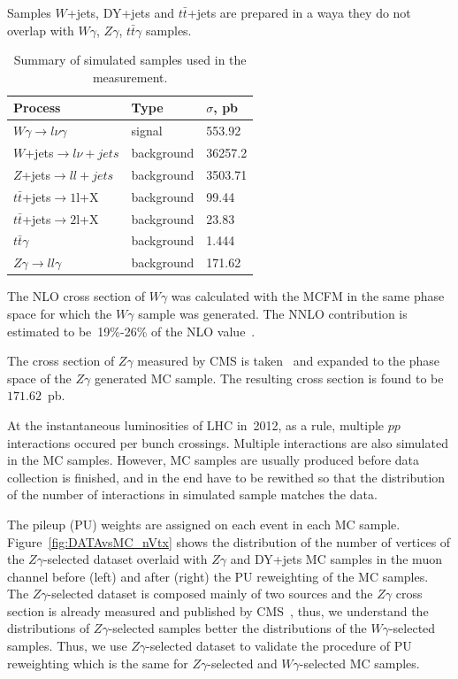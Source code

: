 Samples $W$+jets, DY+jets and $t\bar{t}$+jets are prepared in a waya they do not overlap with $W\gamma$, $Z\gamma$, $t\bar{t}\gamma$ samples.

\begin{table}[h]
  \small
  \begin{center}
    \caption{Summary of simulated samples used in the measurement.}
    \begin{tabular}{|l|l|l|}
      \hline
      Process                              & Type & $\sigma$, pb  \\ \hline
      $W\gamma \rightarrow l\nu\gamma$     & signal & 553.92   \\ \hline %
      $W$+jets$ \rightarrow l\nu + jets$   & background & 36257.2  \\ \hline %
      $Z$+jets$ \rightarrow ll + jets$     & background & 3503.71  \\ \hline
      $t\bar{t}$+jets$\rightarrow 1$l+X    & background & 99.44    \\ \hline %
      $t\bar{t}$+jets$\rightarrow 2$l+X    & background & 23.83    \\ \hline
      $t\bar{t}\gamma$                     & background & 1.444    \\ \hline
      $Z\gamma \rightarrow ll\gamma$       & background & 171.62   \\ \hline
    \end{tabular}
    \label{tab:mc_bkg_samples}
  \end{center}
\end{table} 

The NLO cross section of $W\gamma$ was calculated with the MCFM in the same phase space for which the $W\gamma$ sample was generated. The NNLO contribution is estimated to be~19\%-26\% of the NLO value~\cite{ref_theory_NNLO}.

The cross section of $Z\gamma$ measured by CMS is taken~\cite{ref_Zg8TeV} and expanded to the phase space of the $Z\gamma$ generated MC sample. The resulting cross section is found to be~$171.62$~pb.

At the instantaneous luminosities of LHC in~2012, as a rule, multiple $pp$ interactions occured per bunch crossings. Multiple interactions are also simulated in the MC samples. However, MC samples are usually produced before data collection is finished, and in the end have to be rewithed so that the distribution of the number of interactions in simulated sample matches the data.

The pileup (PU) weights are assigned on each event in each MC sample. Figure~\ref{fig:DATAvsMC_nVtx} shows the distribution of the number of vertices of the $Z\gamma$-selected dataset overlaid with $Z\gamma$ and DY+jets MC samples in the muon channel before (left) and after (right) the PU reweighting of the MC samples. The $Z\gamma$-selected dataset is composed mainly of two sources and the $Z\gamma$ cross section is already measured and published by CMS~\cite{ref_Zg8TeV}, thus, we understand the distributions of $Z\gamma$-selected samples better the distributions of the $W\gamma$-selected samples. Thus, we use $Z\gamma$-selected dataset to validate the procedure of PU reweighting which is the same for $Z\gamma$-selected and $W\gamma$-selected MC samples.

